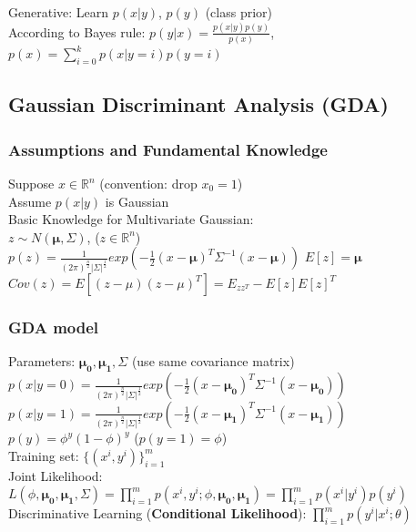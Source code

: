 \documentclass{article}
\begin{document}
\noindent
Generative: Learn $p(x|y)$, $p(y)$ (class prior)\\
According to Bayes rule: $p(y|x) = \frac{p(x|y)p(y)}{p(x)}$, 
$p(x) = \sum\limits_{i=0}^kp(x|y=i)p(y=i)$

\subsection{Gaussian Discriminant Analysis (GDA)}
\subsubsection{Assumptions and Fundamental Knowledge}
Suppose $x \in \mathbb{R}^n$ (convention: drop $x_0=1$)\\
Assume $p(x|y)$ is Gaussian\\

Basic Knowledge for Multivariate Gaussian:\\
\indent
$z \sim N(\boldsymbol{\mu},\Sigma)$, ($z \in \mathbb{R}^n$)\\
\indent
$p(z) = \frac{1}{(2\pi)^{\frac{n}{2}}|\Sigma|^{\frac{1}{2}}}exp(-\frac{1}{2}(x-\boldsymbol{\mu})^T\Sigma^{-1}(x-\boldsymbol{\mu}))$
\indent
$E[z] = \boldsymbol{\mu}$\\
\indent
$Cov(z) = E[(z-\mu)(z-\mu)^T] = E_{zz^T}-E[z]{E[z]}^T$

\subsubsection{GDA model}
Parameters: $\boldsymbol{\mu_0}, \boldsymbol{\mu_1}, \Sigma$ (use same covariance matrix)\\
$p(x|y=0) = \frac{1}{(2\pi)^{\frac{n}{2}}|\Sigma|^{\frac{1}{2}}}exp(-\frac{1}{2}(x-\boldsymbol{\mu_0})^T\Sigma^{-1}(x-\boldsymbol{\mu_0}))$\\
$p(x|y=1) = \frac{1}{(2\pi)^{\frac{n}{2}}|\Sigma|^{\frac{1}{2}}}exp(-\frac{1}{2}(x-\boldsymbol{\mu_1})^T\Sigma^{-1}(x-\boldsymbol{\mu_1}))$\\
$p(y) = \phi^y(1-\phi)^y$ ($p(y=1)=\phi$)\\

\noindent
Training set: $\{(x^i, y^i)\}_{i=1}^m$\\
Joint Likelihood: $L(\phi,\boldsymbol{\mu_0}, \boldsymbol{\mu_1}, \Sigma) = \prod\limits_{i=1}^m p(x^i, y^i; \phi,\boldsymbol{\mu_0}, \boldsymbol{\mu_1}) 
= \prod\limits_{i=1}^m p(x^i|y^i)p(y^i)$\\
\indent\indent
Discriminative Learning (\textbf{Conditional Likelihood}): $\prod\limits_{i=1}^m p(y^i|x^i;\theta)$\\
\end{document}
